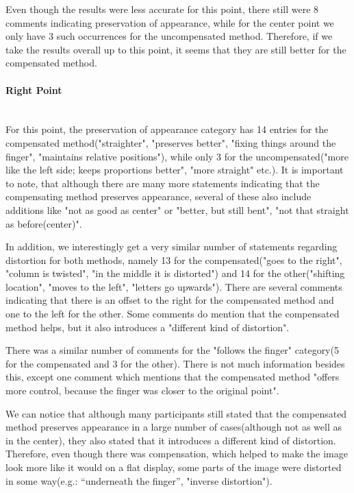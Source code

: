 \documentclass[]{article}
\begin{document}
Even though the results were less accurate for this point, there still were 8 comments indicating preservation of appearance, while for the center point we only have 3 such occurrences for the uncompensated method. Therefore, if we take the results overall up to this point, it seems that they are still better for the compensated method.


\paragraph{Right Point}\mbox{}\\

For this point, the preservation of appearance category has 14 entries for the compensated method("straighter", "preserves better", "fixing things around the finger", "maintains relative positions"), while only 3 for the uncompensated("more like the left side; keeps proportions better", "more straight" etc.). It is important to note, that although there are many more statements indicating that the compensating method preserves appearance, several of these also include additions like "not as good as center" or "better, but still bent", "not that straight as before(center)".

In addition, we interestingly get a very similar number of statements regarding distortion for both methods, namely 13 for the compensated("goes to the right", "column is twisted", "in the middle it is distorted") and 14 for the other("shifting location", "moves to the left", "letters go upwards"). There are several comments indicating that there is an offset to the right for the compensated method and one to the left for the other. Some comments do mention that the compensated method  helps, but it also introduces a "different kind of distortion".

There was a similar number of comments for the "follows the finger" category(5 for the compensated and 3 for the other). There is not much information besides this, except one comment which mentions that the compensated method "offers more control, because the finger was closer to the original point".

We can notice that although many participants still stated that the compensated method preserves appearance in a large number of cases(although not as well as in the center), they also stated that it introduces a different kind of distortion. Therefore, even though there was compensation, which helped to make the image look more like it would on a flat display, some parts of the image were distorted in some way(e.g.: “underneath the finger”, "inverse distortion"). 
\end{document}
